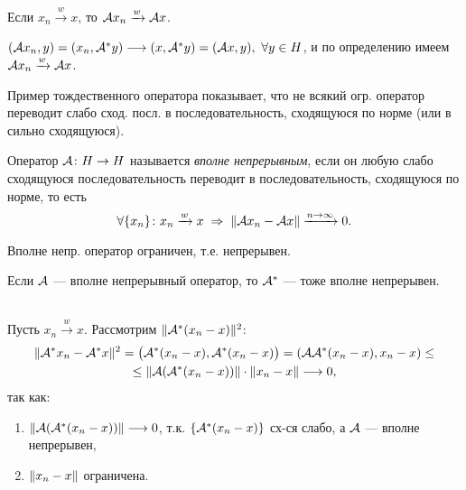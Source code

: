 \begin{lemma}
Если $x_n\xrightarrow{w}x$, то ${\mathcal{A}} x_n \xrightarrow{w} {\mathcal{A}} x$.
\end{lemma}
\begin{proofocre}
$({\mathcal{A}} x_n, y) = (x_n, {\mathcal{A}}^* y)\longrightarrow(x, {\mathcal{A}}^* y)=({\mathcal{A}} x, y),~\forall y\in H$, и по определению имеем ${\mathcal{A}} x_n\xrightarrow{w}{\mathcal{A}} x$.
\end{proofocre}

\begin{example}
Пример тождественного оператора показывает, что не всякий огр. оператор переводит слабо сход. посл. в последовательность, сходящуюся по норме (или в сильно сходящуюся).
\end{example}

\begin{definition}
Оператор ${\mathcal{A}}\colon H\to H$ называется \emph{вполне непрерывным}, если он любую слабо
сходящуюся последовательность переводит в последовательность, сходящуюся по норме, то есть 
$$\forall\{x_n\}\colon x_n\xrightarrow{w}x \;\Rightarrow\; \|{\mathcal{A}} x_n - {\mathcal{A}} x\|\xrightarrow{n\to\infty}0.$$
\end{definition}

\begin{Commentwhite}
Вполне непр. оператор ограничен, т.е. непрерывен.
\end{Commentwhite}

\begin{theorem}
Если ${\mathcal{A}}$ --- вполне непрерывный оператор, то ${\mathcal{A}}^*$ --- тоже вполне непрерывен.
\end{theorem}
\begin{proofocre}
~\\
Пусть $x_n\xrightarrow{w}x$. Рассмотрим $\|{\mathcal{A}}^*(x_n - x)\|^2$:
\begin{multline*}
    \|{\mathcal{A}}^* x_n - {\mathcal{A}}^* x\|^2 = \big({\mathcal{A}}^* (x_n - x), {\mathcal{A}}^* (x_n - x)\big) = ({\mathcal{A}}{\mathcal{A}}^*(x_n - x), x_n - x)\le\\
    \le\|{\mathcal{A}}({\mathcal{A}}^*(x_n - x))\|\cdot\|x_n - x\|\longrightarrow0,
\end{multline*}
так как:
\begin{enumerate}
    \item $\|{\mathcal{A}}({\mathcal{A}}^*(x_n - x))\|\longrightarrow0$, т.к. $\{ {\mathcal{A}}^*(x_n - x) \}$ сх-ся слабо, а ${\mathcal{A}}$ --- вполне непрерывен,
    \item $\|x_n - x\|$ ограничена.
\end{enumerate}
\end{proofocre}



